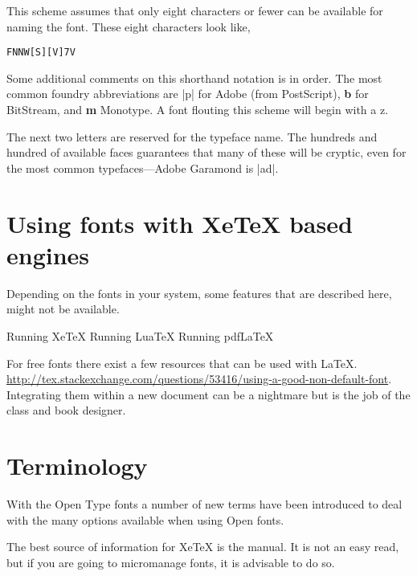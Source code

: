 This scheme assumes that only eight characters or fewer can be available for naming the font. These eight characters look like,

\begin{verbatim}
FNNW[S][V]7V
\end{verbatim}

Some additional comments on this shorthand notation is in order. 
The most common foundry abbreviations are |p| for Adobe (from PostScript), \textbf{b} for BitStream, and \textbf{m} Monotype. A font flouting this scheme will begin with a z.

The next two letters are reserved for the typeface name. The hundreds and hundred of available faces guarantees  that many of these will be cryptic, even for the most common typefaces---Adobe Garamond is |ad|. 



\section{Using fonts with XeTeX based engines}

Depending on the fonts in your system, some features that are described here, might not be available.

\begin{texexample}{}{}
\ifxetex
  Running XeTeX
\else
  \ifluatex
    Running LuaTeX
  \else
    Running pdfLaTeX
  \fi
\fi
\end{texexample}

For free fonts there exist a few resources that can be used with \LaTeX.
\url{http://tex.stackexchange.com/questions/53416/using-a-good-non-default-font}. Integrating them within a new document can be a nightmare but is the job of the class and book designer.

\section{Terminology}

With the Open Type fonts a number of new terms have been introduced to deal with the many
options available when using Open fonts. 

The best source of information for XeTeX is the  manual. It is not an easy read, but if you are going to micromanage fonts, it is advisable to do so.



